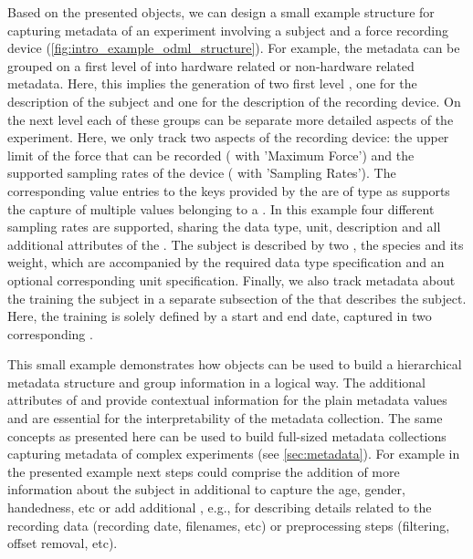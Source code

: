 Based on the presented  objects, we can design a small example structure for capturing metadata of an experiment involving a subject and a force recording device (\cref{fig:intro_example_odml_structure}). For example, the metadata can be grouped on a first level of  into hardware related or non-hardware related metadata. Here, this implies the generation of two first level , one for the description of the subject and one for the description of the recording device. On the next level each of these groups can be separate more detailed aspects of the experiment. Here, we only track two aspects of the recording device: the upper limit of the force that can be recorded ( with  'Maximum Force') and the supported sampling rates of the device ( with  'Sampling Rates'). The corresponding value entries to the keys provided by the  are of type  as  supports the capture of multiple values belonging to a . In this example four different sampling rates are supported, sharing the data type, unit, description and all additional attributes of the .
The subject is described by two , the species and its weight, which are accompanied by the required data type specification and an optional corresponding unit specification. Finally, we also track metadata about the training the subject in a separate subsection of the  that describes the subject. Here, the training is solely defined by a start and end date, captured in two corresponding .

This small example demonstrates how  objects can be used to build a hierarchical metadata structure and group information in a logical way. The additional attributes of  and  provide contextual information for the plain metadata values and are essential for the interpretability of the metadata collection. The same concepts  as presented here can be used to build full-sized metadata collections capturing metadata of complex experiments (see \cref{sec:metadata}). For example in the presented example next steps could comprise the addition of more information about the subject in additional  to capture the age, gender, handedness, etc or add additional , e.g., for describing details related to the recording data (recording date, filenames, etc) or preprocessing steps (filtering, offset removal, etc).




